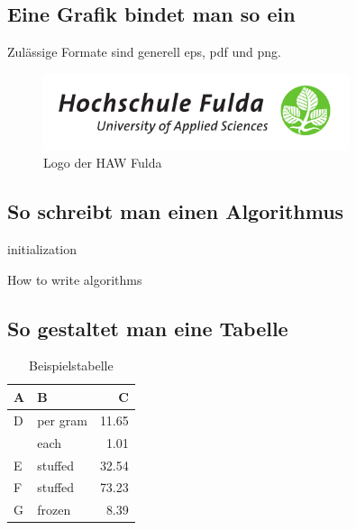 \documentclass[12pt,oneside]{article}
\begin{document}
\subsection{Eine Grafik bindet man so ein}
Zulässige Formate sind generell eps, pdf und png.
\begin{figure}[h]
    \centering
    \includegraphics[width=0.8\textwidth]{logo.pdf}
    \caption{Logo der HAW Fulda}
    \label{fig:bildchen}
\end{figure}

\subsection{So schreibt man einen Algorithmus}

\begin{algorithm}[H]
 initialization\;
 \caption{How to write algorithms\label{alg:dummy}
 }
\end{algorithm}

\subsection{So gestaltet man eine Tabelle}

\begin{table}[H]
\caption{Beispielstabelle\label{tab:beispiel}
}
\centering
\begin{tabular}{llr}
\hline
A    & B & C \\
\hline
D      & per gram    & 11.65      \\
          & each        & 1.01       \\
E       & stuffed     & 32.54      \\
F       & stuffed     & 73.23      \\
G & frozen      & 8.39       \\
\hline
\end{tabular}
\end{table}
\end{document}
